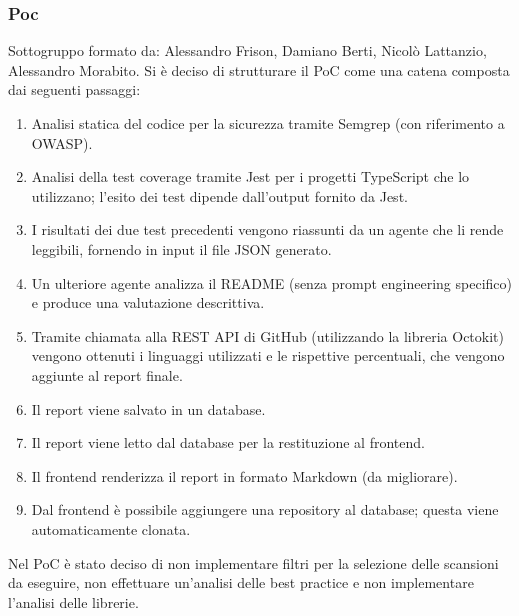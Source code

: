 \documentclass[a4paper, 11pt]{article}
\begin{document}
\subsubsection{Poc} 
Sottogruppo formato da: Alessandro Frison, Damiano Berti, Nicolò Lattanzio, Alessandro Morabito.
Si è deciso di strutturare il PoC come una catena composta dai seguenti passaggi:
\begin{enumerate}
    \item Analisi statica del codice per la sicurezza tramite Semgrep (con riferimento a OWASP).
    \item Analisi della test coverage tramite Jest per i progetti TypeScript che lo utilizzano; l'esito dei test dipende dall'output fornito da Jest.
    \item I risultati dei due test precedenti vengono riassunti da un agente che li rende leggibili, fornendo in input il file JSON generato.
    \item Un ulteriore agente analizza il README (senza prompt engineering specifico) e produce una valutazione descrittiva.
    \item Tramite chiamata alla REST API di GitHub (utilizzando la libreria Octokit) vengono ottenuti i linguaggi utilizzati e le rispettive percentuali, che vengono aggiunte al report finale.
    \item Il report viene salvato in un database.
    \item Il report viene letto dal database per la restituzione al frontend.
    \item Il frontend renderizza il report in formato Markdown (da migliorare).
    \item Dal frontend è possibile aggiungere una repository al database; questa viene automaticamente clonata.
\end{enumerate} 
Nel PoC è stato deciso di non implementare filtri per la selezione delle scansioni da eseguire, non effettuare un'analisi delle best practice e non implementare l'analisi delle librerie.

\end{document}
